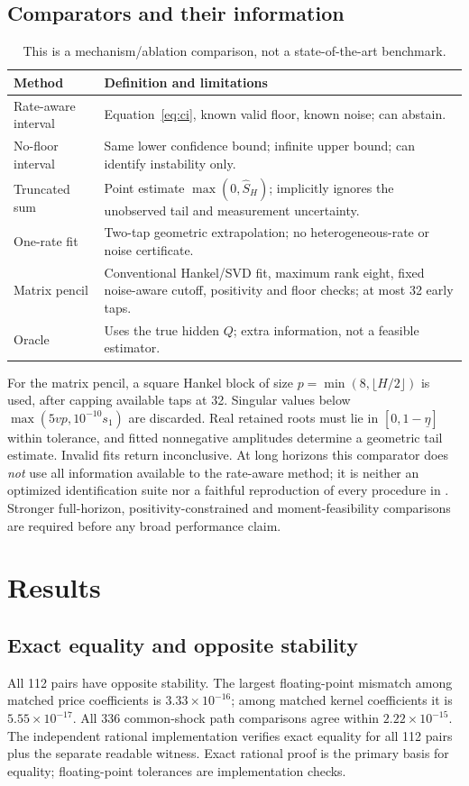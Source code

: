 \documentclass[11pt]{article}
\theoremstyle{remark}\newtheorem{remark}[theorem]{Remark}
\newcommand{\floorate}{\underline\eta}
\begin{document}
\subsection{Comparators and their information}
\begin{table}[ht]
\centering\small
\begin{tabular}{p{.20\linewidth}p{.70\linewidth}}
\toprule Method&Definition and limitations\\\midrule
Rate-aware interval&Equation~\eqref{eq:ci}, known valid floor, known noise; can abstain.\\
No-floor interval&Same lower confidence bound; infinite upper bound; can identify instability only.\\
Truncated sum&Point estimate $\max(0,\widehat S_H)$; implicitly ignores the unobserved tail and measurement uncertainty.\\
One-rate fit&Two-tap geometric extrapolation; no heterogeneous-rate or noise certificate.\\
Matrix pencil&Conventional Hankel/SVD fit, maximum rank eight, fixed noise-aware cutoff, positivity and floor checks; at most 32 early taps.\\
Oracle&Uses the true hidden $Q$; extra information, not a feasible estimator.\\\bottomrule
\end{tabular}
\caption{This is a mechanism/ablation comparison, not a state-of-the-art benchmark.}
\end{table}
For the matrix pencil, a square Hankel block of size $p=\min(8,\lfloor H/2\rfloor)$ is used, after capping available taps at 32. Singular values below $\max(5vp,10^{-10}s_1)$ are discarded. Real retained roots must lie in $[0,1-\floorate]$ within tolerance, and fitted nonnegative amplitudes determine a geometric tail estimate. Invalid fits return inconclusive. At long horizons this comparator does \emph{not} use all information available to the rate-aware method; it is neither an optimized identification suite nor a faithful reproduction of every procedure in \citet{oymak2019}. Stronger full-horizon, positivity-constrained and moment-feasibility comparisons are required before any broad performance claim.

\section{Results}\label{sec:results}
\subsection{Exact equality and opposite stability}
All 112 pairs have opposite stability. The largest floating-point mismatch among matched price coefficients is $3.33\times10^{-16}$; among matched kernel coefficients it is $5.55\times10^{-17}$. All 336 common-shock path comparisons agree within $2.22\times10^{-15}$. The independent rational implementation verifies exact equality for all 112 pairs plus the separate readable witness. Exact rational proof is the primary basis for equality; floating-point tolerances are implementation checks.
\end{document}
